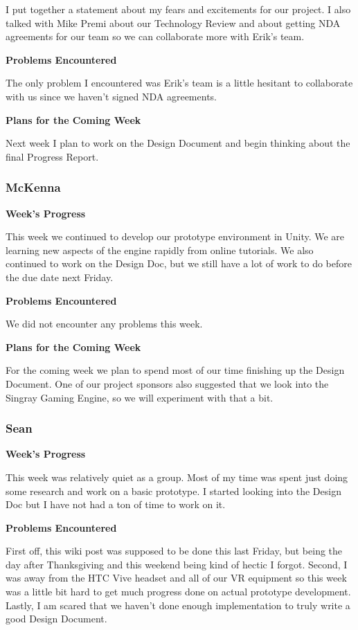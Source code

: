 \documentclass[10pt,journal,compsoc,onecolumn, draftclsnofoot]{IEEEtran}
\begin{document}
I put together a statement about my fears and excitements for our project. I also talked with Mike Premi about our Technology Review and about getting NDA agreements for our team so we can collaborate more with Erik's team.

\noindent \textbf{Problems Encountered}

The only problem I encountered was Erik's team is a little hesitant to collaborate with us since we haven't signed NDA agreements.

\noindent \textbf{Plans for the Coming Week}

Next week I plan to work on the Design Document and begin thinking about the final Progress Report.

\subsubsection{McKenna}
\noindent \textbf{Week's Progress}

This week we continued to develop our prototype environment in Unity. We are learning new aspects of the engine rapidly from online tutorials. We also continued to work on the Design Doc, but we still have a lot of work to do before the due date next Friday.

\noindent \textbf{Problems Encountered}

We did not encounter any problems this week.

\noindent \textbf{Plans for the Coming Week}

For the coming week we plan to spend most of our time finishing up the Design Document. One of our project sponsors also suggested that we look into the Singray Gaming Engine, so we will experiment with that a bit.

\subsubsection{Sean}
\noindent \textbf{Week's Progress}

This week was relatively quiet as a group.  Most of my time was spent just doing some research and work on a basic prototype. I started looking into the Design Doc but I have not had a ton of time to work on it.

\noindent \textbf{Problems Encountered}

First off, this wiki post was supposed to be done this last Friday, but being the day after Thanksgiving and this weekend being kind of hectic I forgot.  Second, I was away from the HTC Vive headset and all of our VR equipment so this week was a little bit hard to get much progress done on actual prototype development.  Lastly, I am scared that we haven't done enough implementation to truly write a good Design Document.
\end{document}
